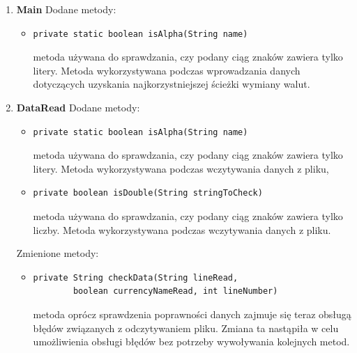\documentclass[12pt]{article}
\begin{document}
\begin{enumerate}
\item \textbf{Main}
\newline\newline
   Dodane metody:
    \begin{itemize}
        \item \begin{verbatim}private static boolean isAlpha(String name)\end{verbatim}
        metoda używana do sprawdzania, czy podany ciąg znaków zawiera tylko litery. Metoda wykorzystywana podczas wprowadzania danych dotyczących uzyskania najkorzystniejszej ścieżki wymiany walut.
    \end{itemize}
\item \textbf{DataRead}
\newline\newline
   Dodane metody:
   \begin{itemize}
        \item \begin{verbatim}private static boolean isAlpha(String name)\end{verbatim}
        metoda używana do sprawdzania, czy podany ciąg znaków zawiera tylko litery. Metoda wykorzystywana podczas wczytywania danych z pliku,
    \end{itemize}
    \begin{itemize}
    \item \begin{verbatim}private boolean isDouble(String stringToCheck)\end{verbatim}
        metoda używana do sprawdzania, czy podany ciąg znaków zawiera tylko liczby. Metoda wykorzystywana
        podczas wczytywania danych z pliku.
    \end{itemize}
    Zmienione metody:
    \begin{itemize}
        \item \begin{verbatim}private String checkData(String lineRead,
        boolean currencyNameRead, int lineNumber)\end{verbatim}
        metoda oprócz sprawdzenia poprawności danych zajmuje się teraz obsługą błędów związanych z odczytywaniem pliku. Zmiana ta nastąpiła w celu umożliwienia obsługi błędów bez potrzeby wywoływania kolejnych metod.
        \end{itemize}


\end{enumerate}
\end{document}
